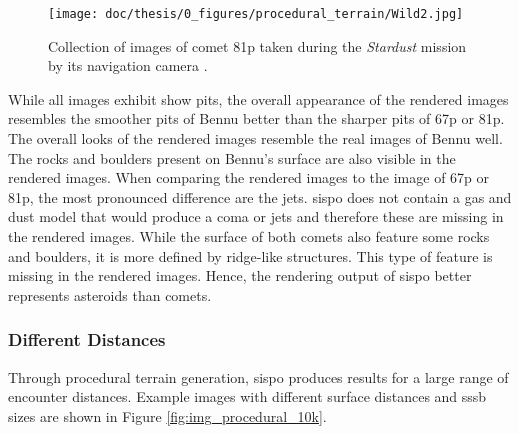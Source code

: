 \begin{figure}[htb]
    \centering
    \texttt{[image: doc/thesis/0\_figures/procedural\_terrain/Wild2.jpg]}
    \caption{Collection of images of comet \acrlong{81p} taken during the \textit{Stardust} mission by its navigation camera \cite{StardustImages}.}
    \label{fig:render_quali_81p}
\end{figure}

While all images exhibit show pits, the overall appearance of the rendered images resembles the smoother pits of Bennu better than the sharper pits of \gls{67p} or \gls{81p}. The overall looks of the rendered images resemble the real images of Bennu well. The rocks and boulders present on Bennu's surface are also visible in the rendered images. When comparing the rendered images to the image of \gls{67p} or \gls{81p}, the most pronounced difference are the jets. \Gls{sispo} does not contain a gas and dust model that would produce a coma or jets and therefore these are missing in the rendered images. While the surface of both comets also feature some rocks and boulders, it is more defined by ridge-like structures. This type of feature is missing in the rendered images. Hence, the rendering output of \gls{sispo} better represents asteroids than comets.

\subsubsection{Different Distances}
Through procedural terrain generation, \gls{sispo} produces results for a large range of encounter distances. Example images with different surface distances and \gls{sssb} sizes are shown in Figure \ref{fig:img_procedural_10k}.

